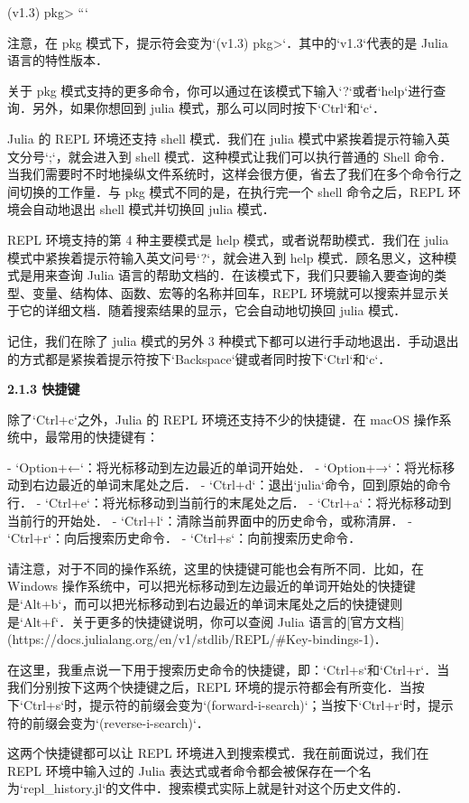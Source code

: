 (v1.3) pkg> 
```

注意，在 pkg 模式下，提示符会变为`(v1.3) pkg>`．其中的`v1.3`代表的是 Julia 语言的特性版本．

关于 pkg 模式支持的更多命令，你可以通过在该模式下输入`?`或者`help`进行查询．另外，如果你想回到 julia 模式，那么可以同时按下`Ctrl`和`c`．

Julia 的 REPL 环境还支持 shell 模式．我们在 julia 模式中紧挨着提示符输入英文分号`;`，就会进入到 shell 模式．这种模式让我们可以执行普通的 Shell 命令．当我们需要时不时地操纵文件系统时，这样会很方便，省去了我们在多个命令行之间切换的工作量．与 pkg 模式不同的是，在执行完一个 shell 命令之后，REPL 环境会自动地退出 shell 模式并切换回 julia 模式．

REPL 环境支持的第 4 种主要模式是 help 模式，或者说帮助模式．我们在 julia 模式中紧挨着提示符输入英文问号`?`，就会进入到 help 模式．顾名思义，这种模式是用来查询 Julia 语言的帮助文档的．在该模式下，我们只要输入要查询的类型、变量、结构体、函数、宏等的名称并回车，REPL 环境就可以搜索并显示关于它的详细文档．随着搜索结果的显示，它会自动地切换回 julia 模式．

记住，我们在除了 julia 模式的另外 3 种模式下都可以进行手动地退出．手动退出的方式都是紧挨着提示符按下`Backspace`键或者同时按下`Ctrl`和`c`．

\textbf{2.1.3 快捷键}

除了`Ctrl+c`之外，Julia 的 REPL 环境还支持不少的快捷键．在 macOS 操作系统中，最常用的快捷键有：

- `Option+←`：将光标移动到左边最近的单词开始处．
- `Option+→`：将光标移动到右边最近的单词末尾处之后．
- `Ctrl+d`：退出`julia`命令，回到原始的命令行．
- `Ctrl+e`：将光标移动到当前行的末尾处之后．
- `Ctrl+a`：将光标移动到当前行的开始处．
- `Ctrl+l`：清除当前界面中的历史命令，或称清屏．
- `Ctrl+r`：向后搜索历史命令．
- `Ctrl+s`：向前搜索历史命令．

请注意，对于不同的操作系统，这里的快捷键可能也会有所不同．比如，在 Windows 操作系统中，可以把光标移动到左边最近的单词开始处的快捷键是`Alt+b`，而可以把光标移动到右边最近的单词末尾处之后的快捷键则是`Alt+f`．关于更多的快捷键说明，你可以查阅 Julia 语言的[官方文档](https://docs.julialang.org/en/v1/stdlib/REPL/#Key-bindings-1)．

在这里，我重点说一下用于搜索历史命令的快捷键，即：`Ctrl+s`和`Ctrl+r`．当我们分别按下这两个快捷键之后，REPL 环境的提示符都会有所变化．当按下`Ctrl+s`时，提示符的前缀会变为`(forward-i-search)`；当按下`Ctrl+r`时，提示符的前缀会变为`(reverse-i-search)`．

这两个快捷键都可以让 REPL 环境进入到搜索模式．我在前面说过，我们在 REPL 环境中输入过的 Julia 表达式或者命令都会被保存在一个名为`repl_history.jl`的文件中．搜索模式实际上就是针对这个历史文件的．

